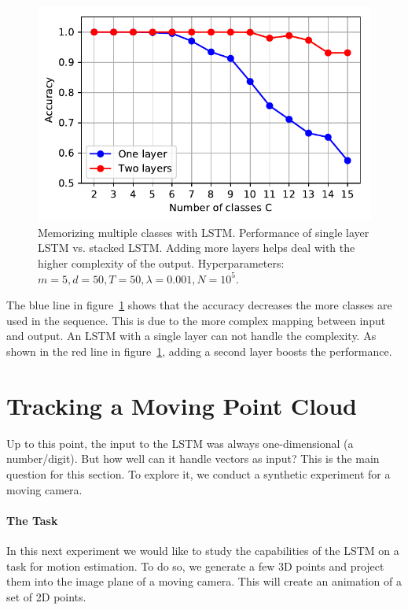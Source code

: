 		\begin{figure}[tb]
			\centering
			\includegraphics[width=0.7\linewidth]{Images/Python-Plots/memory/accuracy-vs-multiple-classes-and-layers}
			\caption[Memorizing the past with the LSTM: Multiple classes]
					{Memorizing multiple classes with LSTM.
					 Performance of single layer LSTM vs. stacked LSTM.
					 Adding more layers helps deal with the higher complexity of the output.
					 Hyperparameters: $m = 5, d = 50, T = 50, \lambda = 0.001, N = 10^5$.
					 }
			\label{fig:accuracy-vs-multiple-classes-and-layers}
		\end{figure}
		The blue line in figure~\ref{fig:accuracy-vs-multiple-classes-and-layers} shows that the accuracy decreases the more classes are used in the sequence.
		This is due to the more complex mapping between input and output. 
		An LSTM with a single layer can not handle the complexity.
		As shown in the red line in figure~\ref{fig:accuracy-vs-multiple-classes-and-layers}, adding a second layer boosts the performance.
		
		
	\section{Tracking a Moving Point Cloud}
		
		Up to this point, the input to the LSTM was always one-dimensional (a number/digit).
		But how well can it handle vectors as input?
		This is the main question for this section.
		To explore it, we conduct a synthetic experiment for a moving camera.
		
		\paragraph{The Task}
		In this next experiment we would like to study the capabilities of the LSTM on a task for motion estimation.
		To do so, we generate a few 3D points and project them into the image plane of a moving camera.
		This will create an animation of a set of 2D points.
		
